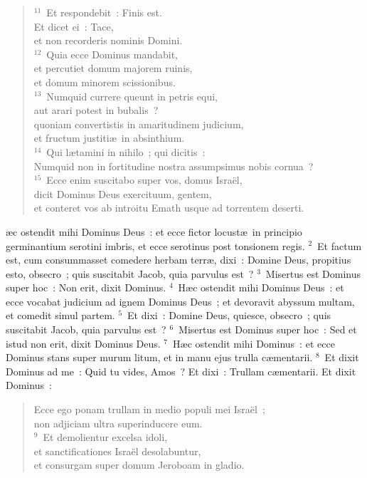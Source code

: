 \begin{verse}
${}^{11}$~Et respondebit~: Finis est.\\ Et dicet ei~: Tace,\\ et non recorderis nominis Domini.\\
${}^{12}$~Quia ecce Dominus mandabit,\\ et percutiet domum majorem ruinis,\\ et domum minorem scissionibus.\\
${}^{13}$~Numquid currere queunt in petris equi,\\ aut arari potest in bubalis~?\\ quoniam convertistis in amaritudinem judicium,\\ et fructum justiti\ae\ in absinthium.\\
${}^{14}$~Qui l\ae tamini in nihilo~; qui dicitis~:\\ Numquid non in fortitudine nostra assumpsimus nobis cornua~?\\
${}^{15}$~Ecce enim suscitabo super vos, domus Isra\"el,\\ dicit Dominus Deus exercituum, gentem,\\ et conteret vos ab introitu Emath usque ad torrentem deserti.\end{verse}



\bchapter
{}\ae c ostendit mihi Dominus Deus~: et ecce fictor locust\ae\ in principio germinantium serotini imbris, et ecce serotinus post tonsionem regis.
${}^{2}$~Et factum est, cum consummasset comedere herbam terr\ae , dixi~: Domine Deus, propitius esto, obsecro~; quis suscitabit Jacob, quia parvulus est~?
${}^{3}$~Misertus est Dominus super hoc~: Non erit, dixit Dominus.
${}^{4}$~H\ae c ostendit mihi Dominus Deus~: et ecce vocabat judicium ad ignem Dominus Deus~; et devoravit abyssum multam, et comedit simul partem.
${}^{5}$~Et dixi~: Domine Deus, quiesce, obsecro~; quis suscitabit Jacob, quia parvulus est~?
${}^{6}$~Misertus est Dominus super hoc~: Sed et istud non erit, dixit Dominus Deus.
${}^{7}$~H\ae c ostendit mihi Dominus~: et ecce Dominus stans super murum litum, et in manu ejus trulla c\ae mentarii.
${}^{8}$~Et dixit Dominus ad me~: Quid tu vides, Amos~? Et dixi~: Trullam c\ae mentarii. Et dixit Dominus~: \begin{verse}Ecce ego ponam trullam in medio populi mei Isra\"el~;\\ non adjiciam ultra superinducere eum.\\
${}^{9}$~Et demolientur excelsa idoli,\\ et sanctificationes Isra\"el desolabuntur,\\ et consurgam super domum Jeroboam in gladio.\end{verse}


